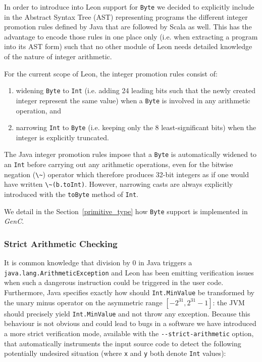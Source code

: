 \documentclass[a4paper,twoside]{article}
\newcommand{\Inline}[1]{\lstinline[basicstyle=\ttfamily]|#1|}
\newcommand{\InlineS}[1]{\lstinline[language=Leon]|#1|}
\newcommand{\GenC}{\emph{GenC}\xspace}
\newcommand{\RefSec}[1]{Section~\ref{#1}}
\begin{document}
In order to introduce into Leon support for \InlineS{Byte} we decided to
explicitly include in the Abstract Syntax Tree (AST) representing programs the
different integer promotion rules defined by Java that are followed by Scala as
well. This has the advantage to encode those rules in one place only (i.e. when
extracting a program into its AST form) such that no other module of Leon needs
detailed knowledge of the nature of integer arithmetic.

For the current scope of Leon, the integer promotion rules consist of:

\begin{enumerate}

\item widening \InlineS{Byte} to \InlineS{Int} (i.e. adding 24 leading bits such
that the newly created integer represent the same value) when a \InlineS{Byte}
is involved in any arithmetic operation, and

\item narrowing \InlineS{Int} to \InlineS{Byte} (i.e. keeping only the 8
least-significant bits) when the integer is explicitly truncated.

\end{enumerate}

The Java integer promotion rules impose that a \InlineS{Byte} is automatically
widened to an \InlineS{Int} before carrying out any arithmetic operations, even
for the bitwise negation (\InlineS{\~}) operator which therefore produces 32-bit
integers as if one would have written \InlineS{\~(b.toInt)}. However, narrowing
casts are always explicitly introduced with the \InlineS{toByte} method of
\InlineS{Int}.

We detail in the \RefSec{primitive_type} how \InlineS{Byte} support is
implemented in \GenC.

\subsubsection*{Strict Arithmetic Checking}


It is common knowledge that division by 0 in Java triggers a
\InlineS{java.lang.ArithmeticException} and Leon has been emitting verification
issues when such a dangerous instruction could be triggered in the user code.
Furthermore, Java specifies exactly how should \InlineS{Int.MinValue} be
transformed by the unary minus operator on the asymmetric range
$[-2^{31},2^{31}-1]$: the JVM should precisely yield \InlineS{Int.MinValue} and
not throw any exception. Because this behaviour is not obvious and could lead to
bugs in a software we have introduced a more strict verification mode, available
with the \Inline{--strict-arithmetic} option, that automatically instruments the
input source code to detect the following potentially undesired situation (where
\InlineS{x} and \InlineS{y} both denote \InlineS{Int} values):
\end{document}
